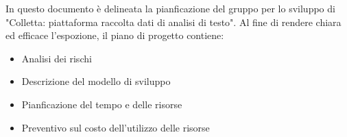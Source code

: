 In questo documento è delineata la pianficazione del gruppo \gruppo \space per lo sviluppo
di "Colletta: piattaforma raccolta dati di analisi di testo". \newline
Al fine di rendere chiara ed efficace l'espozione, il piano di progetto contiene:
\begin{itemize}
    \item Analisi dei rischi
    \item Descrizione del modello di sviluppo
    \item Pianficazione del tempo e delle risorse
    \item Preventivo sul costo dell'utilizzo delle risorse
\end{itemize}